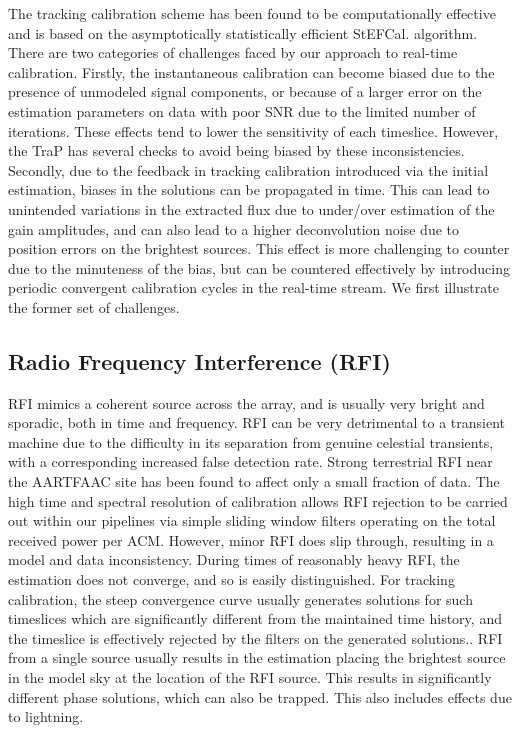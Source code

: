 \documentclass{aa}
\begin{document}
The tracking calibration  scheme has been found to  be computationally effective
and is based on  the asymptotically statistically efficient StEFCal.  algorithm.
There  are two  categories  of challenges  faced  by our  approach to  real-time
calibration. Firstly, the instantaneous calibration can become biased due to the
presence of  unmodeled signal components,  or because of  a larger error  on the
estimation  parameters on  data  with poor  SNR  due to  the  limited number  of
iterations.    These   effects  tend   to   lower   the   sensitivity  of   each
timeslice. However, the  TraP has several checks to avoid  being biased by these
inconsistencies.   Secondly,  due  to   the  feedback  in  tracking  calibration
introduced via the initial estimation, biases in the solutions can be propagated
in time.   This can lead to unintended  variations in the extracted  flux due to
under/over estimation  of the  gain amplitudes,  and can also  lead to  a higher
deconvolution noise due to position errors on the brightest sources. This effect
is more  challenging to counter due  to the minuteness  of the bias, but  can be
countered effectively  by introducing periodic convergent  calibration cycles in
the real-time stream. We first illustrate the former set of challenges.


\subsection{Radio Frequency Interference (RFI)}

RFI mimics  a coherent source across the  array, and is usually  very bright and
sporadic, both in time and frequency. RFI can be very detrimental to a transient
machine  due  to  the  difficulty  in  its  separation  from  genuine  celestial
transients,  with  a  corresponding   increased  false  detection  rate.  Strong
terrestrial RFI  near the AARTFAAC  site has been  found to affect only  a small
fraction of  data. The high time  and spectral resolution  of calibration allows
RFI rejection to  be carried out within our pipelines  via simple sliding window
filters operating on the total received  power per ACM.  However, minor RFI does
slip  through, resulting in  a model  and data  inconsistency.  During  times of
reasonably  heavy  RFI, the  estimation  does not  converge,  and  so is  easily
distinguished.  For  tracking calibration,  the steep convergence  curve usually
generates solutions  for such timeslices which are  significantly different from
the maintained  time history, and the  timeslice is effectively  rejected by the
filters on the generated solutions.. RFI from  a single source  usually results in  the estimation
placing the brightest source in the model sky at the location of the RFI source.
This  results in  significantly different  phase  solutions, which  can also  be
trapped. This also includes effects due to lightning.
\end{document}
